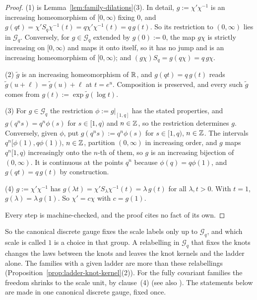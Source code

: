 \begin{proof}
(1) is Lemma~\ref{lem:family-dilations}(3). In detail, $g := \chi'\chi^{-1}$ is an increasing
homeomorphism of $[0,\infty)$ fixing $0$, and $g(qt) = \chi'S_q\chi^{-1}(t) = q\chi'\chi^{-1}(t) =
q\,g(t)$. So its restriction to $(0,\infty)$ lies in $\mathcal{G}_q$. Conversely, for
$g \in \mathcal{G}_q$ extended by $g(0) := 0$, the map $g\chi$ is strictly increasing on
$[0,\infty)$ and maps it onto itself, so it has no jump and is an increasing homeomorphism of
$[0,\infty)$; and $(g\chi)S_q = g(q\chi) = q\,g\chi$.

(2) $\tilde g$ is an increasing homeomorphism of $\mathbb{R}$, and $g(qt) = q\,g(t)$ reads
$\tilde g(u + \ell) = \tilde g(u) + \ell$ at $t = e^u$. Composition is preserved, and every such
$\tilde g$ comes from $g(t) := \exp\tilde g(\log t)$.

(3) For $g \in \mathcal{G}_q$ the restriction $\phi := g|_{[1,q]}$ has the stated properties, and
$g(q^ns) = q^n\phi(s)$ for $s \in [1,q)$ and $n \in \mathbb{Z}$, so the restriction determines $g$.
Conversely, given $\phi$, put $g(q^ns) := q^n\phi(s)$ for $s \in [1,q)$, $n \in \mathbb{Z}$. The intervals
$q^n[\phi(1), q\phi(1))$, $n \in \mathbb{Z}$, partition $(0,\infty)$ in increasing order, and $g$ maps
$q^n[1,q)$ increasingly onto the $n$-th of them, so $g$ is an increasing bijection of $(0,\infty)$.
It is continuous at the points $q^n$ because $\phi(q) = q\phi(1)$, and $g(qt) = q\,g(t)$ by
construction.

(4) $g := \chi'\chi^{-1}$ has $g(\lambda t) = \chi'S_\lambda\chi^{-1}(t) = \lambda\,g(t)$ for all
$\lambda, t > 0$. With $t = 1$, $g(\lambda) = \lambda\,g(1)$. So $\chi' = c\chi$ with $c = g(1)$.

Every step is machine-checked, and the proof cites no fact of its own.
\end{proof}

So the canonical discrete gauge fixes the scale labels only up to $\mathcal{G}_q$, and which scale
is called $1$ is a choice in that group. A relabelling in $\mathcal{G}_q$ that fixes the knots
changes the laws between the knots and leaves the knot kernels and the ladder alone. The families
with a given ladder are more than these relabellings (Proposition~\ref{prop:ladder-knot-kernel}(2)).
For the fully covariant families the freedom shrinks to the scale unit, by clause~(4)
(see also ). The statements below are made in one
canonical discrete gauge, fixed once.

